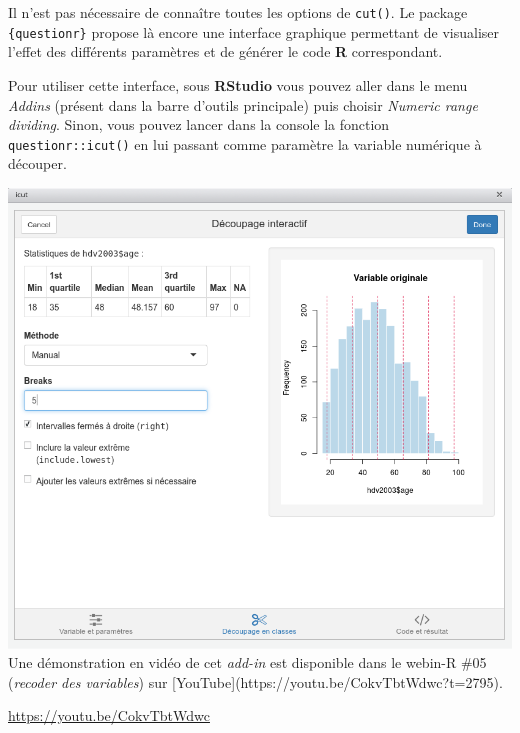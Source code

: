 \documentclass[
  letterpaper,
  DIV=11,
  numbers=noendperiod,
  oneside]{scrreprt}
\begin{document}
\begin{tcolorbox}[enhanced jigsaw, colbacktitle=quarto-callout-tip-color!10!white, opacityback=0, toprule=.15mm, colback=white, coltitle=black, bottomtitle=1mm, toptitle=1mm, titlerule=0mm, rightrule=.15mm, title=\textcolor{quarto-callout-tip-color}{\faLightbulb}\hspace{0.5em}{Interface graphique}, breakable, bottomrule=.15mm, opacitybacktitle=0.6, arc=.35mm, left=2mm, leftrule=.75mm, colframe=quarto-callout-tip-color-frame]

Il n'est pas nécessaire de connaître toutes les options de
\texttt{cut()}. Le package \texttt{\{questionr\}} propose là encore une
interface graphique permettant de visualiser l'effet des différents
paramètres et de générer le code \textbf{R} correspondant.

Pour utiliser cette interface, sous \textbf{RStudio} vous pouvez aller
dans le menu \emph{Addins} (présent dans la barre d'outils principale)
puis choisir \emph{Numeric range dividing}. Sinon, vous pouvez lancer
dans la console la fonction \texttt{questionr::icut()} en lui passant
comme paramètre la variable numérique à découper.

\includegraphics{manipulation/ressources/icut.png} Une démonstration en
vidéo de cet \emph{add-in} est disponible dans le webin-R \#05
(\emph{recoder des variables}) sur
{[}YouTube{]}(https://youtu.be/CokvTbtWdwc?t=2795).

\url{https://youtu.be/CokvTbtWdwc}

\end{tcolorbox}
\end{document}
